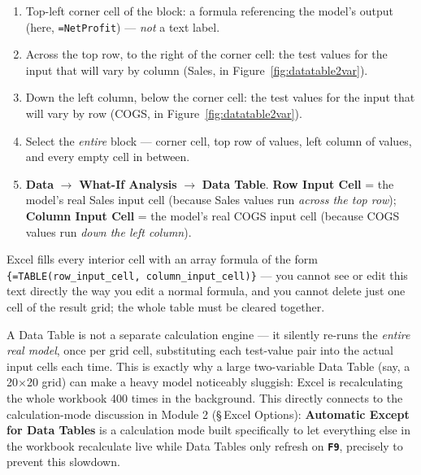 \documentclass[11pt,a4paper]{article}
\newcommand{\key}[1]{\texttt{\colorbox{black!8}{\textbf{#1}}}}
\begin{document}
\begin{formulasyntax}
\begin{enumerate}
  \item Top-left corner cell of the block: a formula referencing the model's output (here, \texttt{=NetProfit}) --- \emph{not} a text label.
  \item Across the top row, to the right of the corner cell: the test values for the input that will vary by column (Sales, in Figure~\ref{fig:datatable2var}).
  \item Down the left column, below the corner cell: the test values for the input that will vary by row (COGS, in Figure~\ref{fig:datatable2var}).
  \item Select the \emph{entire} block --- corner cell, top row of values, left column of values, and every empty cell in between.
  \item \textbf{Data} $\rightarrow$ \textbf{What-If Analysis} $\rightarrow$ \textbf{Data Table}. \textbf{Row Input Cell} = the model's real Sales input cell (because Sales values run \emph{across the top row}); \textbf{Column Input Cell} = the model's real COGS input cell (because COGS values run \emph{down the left column}).
\end{enumerate}
Excel fills every interior cell with an array formula of the form \texttt{\{=TABLE(row\_input\_cell, column\_input\_cell)\}} --- you cannot see or edit this text directly the way you edit a normal formula, and you cannot delete just one cell of the result grid; the whole table must be cleared together.
\end{formulasyntax}

\begin{keyconcept}
A Data Table is not a separate calculation engine --- it silently re-runs the \emph{entire real model}, once per grid cell, substituting each test-value pair into the actual input cells each time. This is exactly why a large two-variable Data Table (say, a 20$\times$20 grid) can make a heavy model noticeably sluggish: Excel is recalculating the whole workbook 400 times in the background. This directly connects to the calculation-mode discussion in Module 2 (\S\,Excel Options): \textbf{Automatic Except for Data Tables} is a calculation mode built specifically to let everything else in the workbook recalculate live while Data Tables only refresh on \key{F9}, precisely to prevent this slowdown.
\end{keyconcept}
\end{document}

